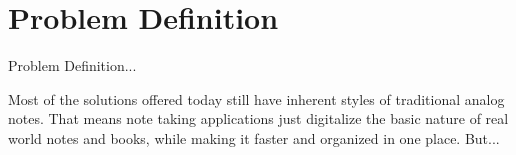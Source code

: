 \section{Problem Definition}
\label{sec:problem-definition}

Problem Definition...

Most of the solutions offered today still have inherent styles of traditional analog notes.
That means note taking applications just digitalize the basic nature of real world notes and books, while making it faster and organized in one place.
But...

